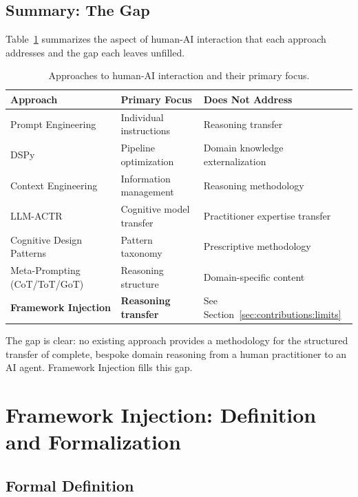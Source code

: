 \documentclass[12pt,a4paper]{article}
\begin{document}
\subsection{Summary: The Gap}

Table~\ref{tab:gap} summarizes the aspect of human-AI interaction that each approach addresses and the gap each leaves unfilled.

\begin{table}[H]
\centering
\caption{Approaches to human-AI interaction and their primary focus.}
\label{tab:gap}
\begin{tabular}{@{}lll@{}}
\toprule
\textbf{Approach} & \textbf{Primary Focus} & \textbf{Does Not Address} \\
\midrule
Prompt Engineering & Individual instructions & Reasoning transfer \\
DSPy & Pipeline optimization & Domain knowledge externalization \\
Context Engineering & Information management & Reasoning methodology \\
LLM-ACTR & Cognitive model transfer & Practitioner expertise transfer \\
Cognitive Design Patterns & Pattern taxonomy & Prescriptive methodology \\
Meta-Prompting (CoT/ToT/GoT) & Reasoning structure & Domain-specific content \\
\midrule
\textbf{Framework Injection} & \textbf{Reasoning transfer} & See Section~\ref{sec:contributions:limits} \\
\bottomrule
\end{tabular}
\end{table}

The gap is clear: no existing approach provides a methodology for the structured transfer of complete, bespoke domain reasoning from a human practitioner to an AI agent. Framework Injection fills this gap.


\section{Framework Injection: Definition and Formalization}
\label{sec:definition}

\subsection{Formal Definition}
\label{sec:definition:formal}
\end{document}
